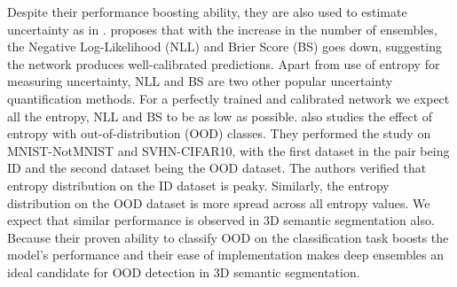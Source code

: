 Despite their performance boosting ability, they are also used to estimate uncertainty as in \cite{lakshminarayanan2016simple}.
\cite{lakshminarayanan2016simple} proposes that with the increase in the number of ensembles, the Negative Log-Likelihood (NLL) and Brier Score (BS) goes down, suggesting the network produces well-calibrated predictions.
Apart from use of entropy for measuring uncertainty, NLL and BS are two other popular uncertainty quantification methods.
For a perfectly trained and calibrated network we expect all the entropy, NLL and BS to be as low as possible.
\cite{lakshminarayanan2016simple} also studies the effect of entropy with out-of-distribution (OOD) classes.
They performed the study on MNIST-NotMNIST and SVHN-CIFAR10, with the first dataset in the pair being ID and the second dataset being the OOD dataset.
The authors verified that entropy distribution on the ID dataset is peaky. Similarly, the entropy distribution on the OOD dataset is more spread across all entropy values.
We expect that similar performance is observed in 3D semantic segmentation also.
Because their proven ability to classify OOD on the classification task boosts the model's performance and their ease of implementation makes deep ensembles an ideal candidate for OOD detection in 3D semantic segmentation.

